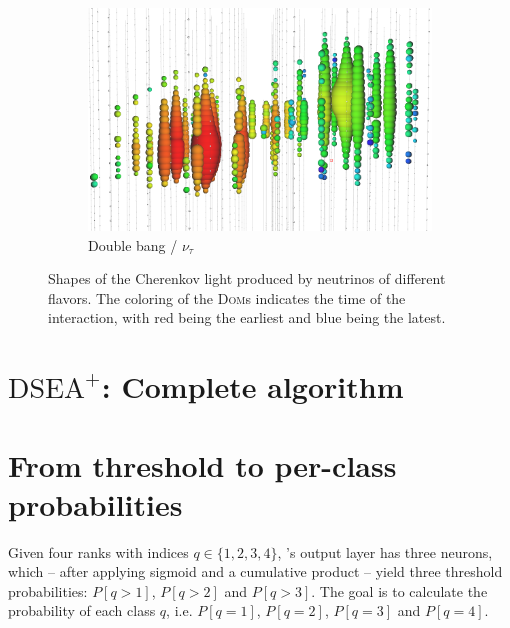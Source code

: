 \begin{figure}
\begin{subfigure}{0.3\textwidth}
    \centering
    \includegraphics[width=\textwidth]{content/img/signatures/double_bang.png}
    \caption{
        Double bang / $\nu_\tau$
    }
  \end{subfigure}
  \caption{
    Shapes of the Cherenkov light produced by neutrinos of different flavors.
    The coloring of the \textsc{Dom}s indicates the time of the interaction,
    with red being the earliest and blue being the latest.
    \cite{kowalski2017} %
  }
  \label{fig:img:icecube:interactions}
\end{figure}


\clearpage
\section{\texorpdfstring{$\text{DSEA}^+$}{DSEA+}: Complete algorithm} \label{sec:alg:dseaplus}



\clearpage
\section{From threshold to per-class probabilities}
\label{sec:appendix:corn_probas}
Given four ranks with indices $q \in \{1, 2, 3, 4\}$,
\corn{}'s output layer has three neurons, which
  – after applying sigmoid and a cumulative product –
yield three threshold probabilities:
	$P[q>1]$,
	$P[q>2]$ and
	$P[q>3]$.
The goal is to calculate the probability of each class $q$,
i.e. $P[q=1]$, $P[q=2]$, $P[q=3]$ and $P[q=4]$.

